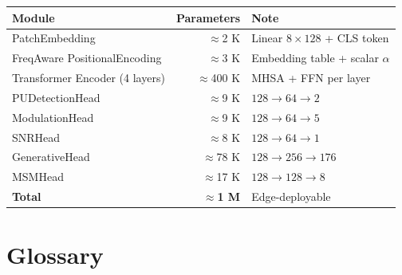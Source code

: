 \documentclass[11pt,a4paper]{article}
\begin{document}
\begin{center}
\renewcommand{\arraystretch}{1.25}
\begin{tabular}{lrl}
\toprule
\textbf{Module} & \textbf{Parameters} & \textbf{Note} \\
\midrule
PatchEmbedding               & $\approx$2 K   & Linear $8\!\times\!128$ + CLS token \\
FreqAware PositionalEncoding & $\approx$3 K   & Embedding table + scalar $\alpha$ \\
Transformer Encoder (4 layers) & $\approx$400 K & MHSA + FFN per layer \\
PUDetectionHead              & $\approx$9 K   & $128\!\to\!64\!\to\!2$ \\
ModulationHead               & $\approx$9 K   & $128\!\to\!64\!\to\!5$ \\
SNRHead                      & $\approx$8 K   & $128\!\to\!64\!\to\!1$ \\
GenerativeHead               & $\approx$78 K  & $128\!\to\!256\!\to\!176$ \\
MSMHead                      & $\approx$17 K  & $128\!\to\!128\!\to\!8$ \\
\midrule
\textbf{Total}               & $\approx$\textbf{1 M} & Edge-deployable \\
\bottomrule
\end{tabular}
\end{center}

\section{Glossary}
\end{document}
